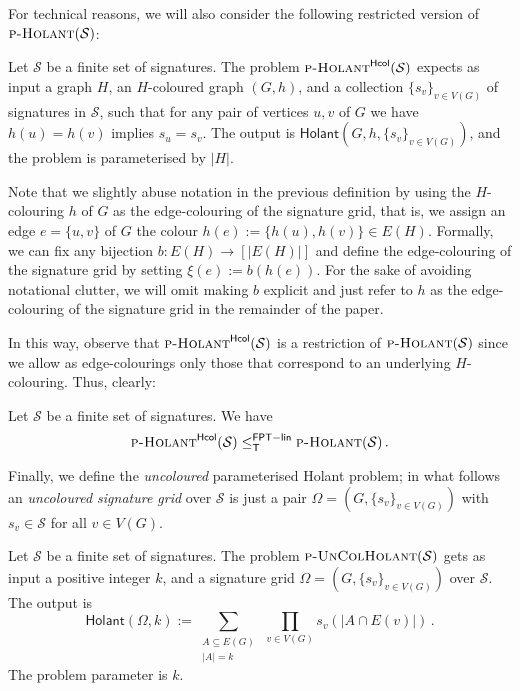 \documentclass[authorcolumns,numberwithinsect]{no-lipics-v2022}
\newcommand{\fptlinred}{\leq^{\mathsf{FPT-lin}}_{\mathsf{T}}}
\newcommand{\holantprob}{\text{\sc{p-Holant}}}
\newcommand{\holantprobstar}{\text{\sc{p-Holant}}^{\mathsf{Hcol}}}
\newcommand{\holant}{\mathsf{Holant}}
\begin{document}
For technical reasons, we will also consider the following restricted version of $\textsc{p-Holant}(\mathcal{S})$:
\begin{definition}[$\holantprobstar(\mathcal{S})$]
    Let $\mathcal{S}$ be a finite set of signatures. The problem $\holantprobstar(\mathcal{S})$ expects as input a graph $H$, an $H$-coloured graph $(G,h)$, and a collection $\{s_v\}_{v\in V(G)}$ of signatures in $\mathcal{S}$, such that for any pair of vertices $u,v$ of $G$ we have $h(u)=h(v)$ implies $s_u=s_v$. The output is $\holant(G,h,\{s_v\}_{v\in V(G)})$, and the problem is parameterised by $|H|$.
\end{definition}

Note that we slightly abuse notation in the previous definition by using the $H$-colouring $h$ of $G$ as the edge-colouring of the signature grid, that is, we assign an edge $e=\{u,v\}$ of $G$ the colour $h(e):=\{h(u),h(v)\} \in E(H)$. Formally, we can fix any bijection $b:E(H) \to [|E(H)|]$ and define the edge-colouring of the signature grid by setting $\xi(e):=b(h(e))$. For the sake of avoiding notational clutter, we will omit making $b$ explicit and just refer to $h$ as the edge-colouring of the signature grid in the remainder of the paper. 

In this way, observe that $\holantprobstar(\mathcal{S})$ is a restriction of $\holantprob(\mathcal{S})$ since we allow as edge-colourings only those that correspond to an underlying $H$-colouring. Thus, clearly:

\begin{fact}\label{fact:easy_direction_equivalence}
    Let $\mathcal{S}$ be a finite set of signatures. We have
    \[ \holantprobstar(\mathcal{S}) \fptlinred \holantprob(\mathcal{S}) \,.\]
\end{fact}

Finally, we define the \emph{uncoloured} parameterised Holant problem; in what follows an \emph{uncoloured signature grid} over $\mathcal{S}$ is just a pair $\Omega=(G,\{s_v\}_{v\in V(G)})$ with $s_v\in \mathcal{S}$ for all $v\in V(G)$.
\begin{definition}
    Let $\mathcal{S}$ be a finite set of signatures. The problem $\text{\sc{p-UnColHolant}}(\mathcal{S})$ gets as input a positive integer $k$, and a signature grid $\Omega=(G,\{s_v\}_{v\in V(G)})$ over $\mathcal{S}$. The output is
    \[ \holant(\Omega,k):= \sum_{\substack{A \subseteq E(G)\\|A|=k}}~\prod_{v\in V(G)} s_v(|A \cap E(v)|)\,. \]
    The problem parameter is $k$.
\end{definition}
\end{document}
